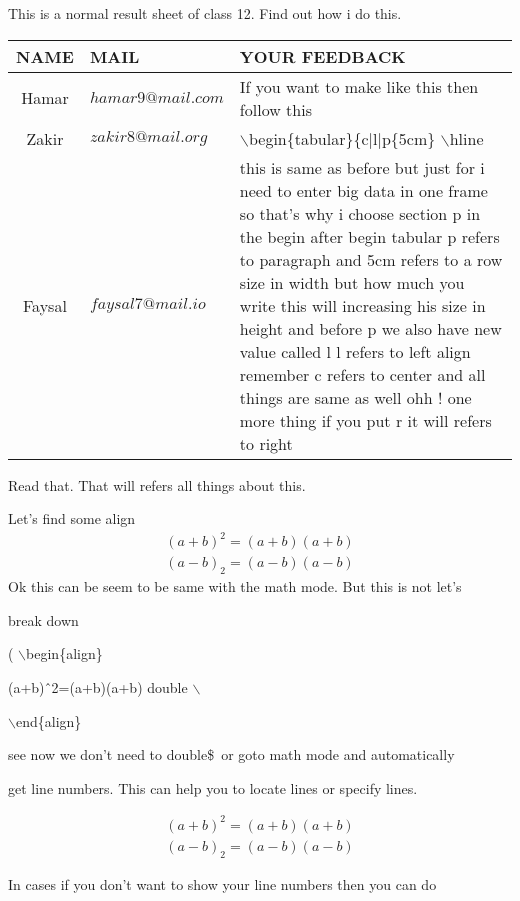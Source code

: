 \documentclass[11pt]{article}
\begin{document}
\vspace{1cm}

 This is a normal result sheet of class 12. Find out how i do this.
 
 \pagebreak

\begin{tabular}{|c|l|p{5cm}|}
\hline
NAME & MAIL & YOUR FEEDBACK \\ \hline

Hamar & $hamar9@mail.com$ & If you want to make like this then follow this \\ \hline
Zakir & $zakir8@mail.org$ & $\backslash$begin\{tabular\}\{c$|$l$|$p\{5cm\} $\backslash$hline \\ \hline
Faysal & $faysal7@mail.io$ & this is same as before but just for i need to enter big data in one frame so that's why i choose section {p} in the begin after begin tabular p refers to paragraph and {5cm} refers to a row size in width but how much you write this will increasing his size in height and before p we also have new value called {l} l refers to left align remember c refers to center and all things are same as well ohh ! one more thing if you put {r} it will refers to right \\ \hline
\end{tabular}

\vspace{1cm}

Read that. That will refers all things about this.

\pagebreak
Let's find some align
\begin{align}
(a+b)^2=(a+b)(a+b)\\
(a-b)_2=(a-b)(a-b)
\end{align}
Ok this can be seem to be same with the math mode. But this is not let's

 break down

( $\backslash$begin\{align\} 

(a+b)\^\ 2=(a+b)(a+b) double $\backslash$ 

$\backslash$end\{align\}

see now we don't need to double\$\ or goto math mode and automatically

 get
line numbers. This can help you to locate lines or specify lines.

\begin{align*}
(a+b)^2=(a+b)(a+b)\\
(a-b)_2=(a-b)(a-b)
\end{align*}

In cases if you don't want to show your line numbers then you can do
\end{document}
